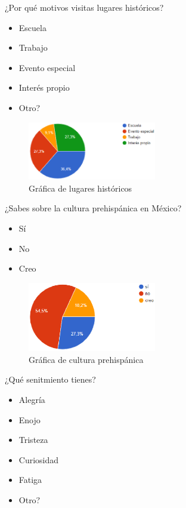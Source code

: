 	
	¿Por qué motivos visitas lugares históricos?
	\begin{itemize}
		\item Escuela
		\item Trabajo
		\item Evento especial
		\item Interés propio
		\item Otro?
	\end{itemize}

\begin{figure}
	\centering
	\caption{Gráfica de lugares históricos}
	\label{fig:pre03}
	\includegraphics[width=0.5\textwidth]{04ResultadosObetnidos/pruebaR/imagenes/que/pre03}
\end{figure}

	
	¿Sabes sobre la cultura prehispánica en México?
	\begin{itemize}
		\item Sí
		\item No
		\item Creo
	\end{itemize}

\begin{figure}
	\centering
	\caption{Gráfica de cultura prehispánica}
	\label{fig:pre04}
	\includegraphics[width=0.5\textwidth]{04ResultadosObetnidos/pruebaR/imagenes/que/pre04}
\end{figure}

	
	¿Qué senitmiento tienes? 
	\begin{itemize}
		\item Alegría
		\item Enojo
		\item Tristeza
		\item Curiosidad
		\item Fatiga
		\item Otro?
	\end{itemize}

